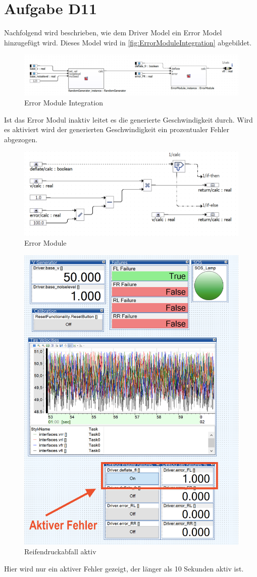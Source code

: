 
\chapter{Aufgabe D11}
Nachfolgend wird beschrieben, wie dem Driver Model ein Error Model hinzugefügt wird. Dieses Model wird in \autoref{fig:ErrorModuleIntegration} abgebildet.
\begin{figure}[H]
	\centering
	\includegraphics[width=1\linewidth]{../Graphiken/Errorintegration.png}
	\caption{Error Module Integration}
	\label{fig:ErrorModuleIntegration}
\end{figure}
Ist das Error Modul inaktiv leitet es die generierte Geschwindigkeit durch. Wird es aktiviert wird der generierten Geschwindigkeit ein prozentualer Fehler abgezogen.
\begin{figure}[H]
	\centering
	\includegraphics[width=0.85\linewidth]{../Graphiken/ErrorModule.png}
	\caption{Error Module}
	\label{fig:ErrorModule}
\end{figure}

\begin{figure}[H]
	\centering
\includegraphics[width=0.85\linewidth]{../Graphiken/aktiveError.png}
\caption{Reifendruckabfall aktiv}
\label{fig:ErrorModule}
\end{figure}
Hier wird nur ein aktiver Fehler gezeigt, der länger als 10 Sekunden aktiv ist.